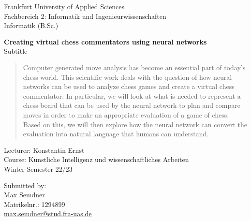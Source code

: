 \begin{titlepage}
\begin{flushleft}
Frankfurt University of Applied Sciences\\
Fachbereich 2: Informatik und Ingenieurwissenschaften\\
Informatik (B.Sc.)\\
\end{flushleft}

\vspace{3.5cm}

\begin{center}
\Large
\textbf{Creating virtual chess commentators using neural networks}\\
Subtitle
\end{center}

\begin{abstract}
Computer generated move analysis has become an essential part of today's chess world. This scientific work deals with the question of how neural networks can be used to analyze chess games and create a virtual chess commentator. In particular, we will look at what is needed to represent a chess board that can be used by the neural network to plan and compare moves in order to make an appropriate evaluation of a game of chess. Based on this, we will then explore how the neural network can convert the evaluation into natural language that humans can understand.
\end{abstract}

\vspace{6cm}
	
\begin{flushright}
Lecturer: Konstantin Ernst\\
Course: Künstliche Intelligenz und wissenschaftliches Arbeiten\\
Winter Semester 22/23\\
\end{flushright}

\vspace{2cm}

\begin{flushleft}
Submitted by:\\
Max Semdner\\
Matrikelnr.: 1294899\\
\href{mailto: max.semdner@stud.fra-uas.de}{max.semdner@stud.fra-uas.de}\\
\end{flushleft}

\end{titlepage}